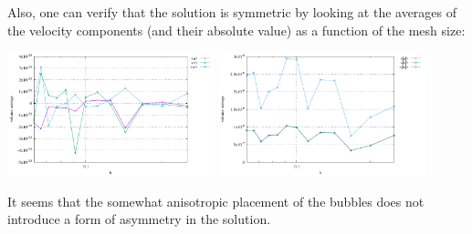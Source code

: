 Also, one can verify that the solution is symmetric by looking at the averages of the 
velocity components (and their absolute value) as a function of the mesh size:
\begin{center}
\includegraphics[width=6cm]{python_codes/fieldstone_82/RESULTS/bench4/averages.pdf}
\includegraphics[width=6cm]{python_codes/fieldstone_82/RESULTS/bench4/averages_abs.pdf}
\end{center}
It seems that the somewhat anisotropic placement of the bubbles does not introduce 
a form of asymmetry in the solution.

